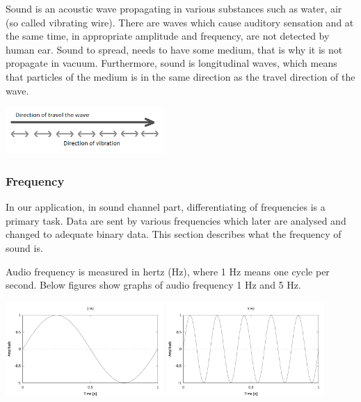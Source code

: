 \documentclass[11pt,titlepage]{article}
\theoremstyle{plain}
\begin{document}
\vspace{5mm}

Sound is an acoustic wave propagating in various substances such as water, air (so called vibrating wire). There are waves which cause auditory sensation and at the same time, in appropriate amplitude and frequency, are not detected by human ear. Sound to spread, needs to have some medium, that is why it is not propagate in vacuum. Furthermore, sound is longitudinal waves, which means that particles of the medium is in the same direction as the travel direction of the wave.



\begin{center}
		\includegraphics[width=0.45\textwidth]{img/longitudinal_wave}
\end{center}
\subsubsection{Frequency}
In our application, in sound channel part, differentiating of frequencies is a primary task. Data are sent by various frequencies which later are analysed and changed to adequate binary data. This section describes what the frequency of sound is.

\vspace{5mm}

Audio frequency is measured in hertz (Hz), where 1 Hz means one cycle per second. Below figures show graphs of audio frequency 1 Hz and 5 Hz.


\begin{center}
	\includegraphics[width=0.45\textwidth]{img/frequency_1Hz.pdf}
	\includegraphics[width=0.45\textwidth]{img/frequency_5Hz.pdf}
\end{center}
\end{document}
